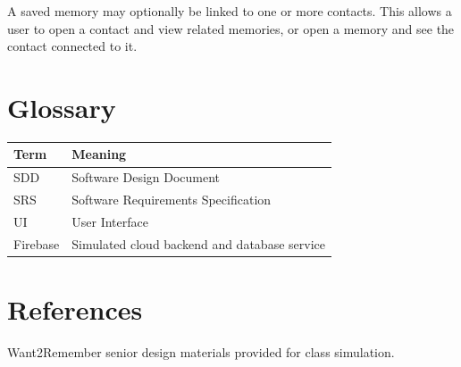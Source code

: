 \documentclass{article}
\begin{document}
A saved memory may optionally be linked to one or more contacts. This allows a user to open a contact and view related memories, or open a memory and see the contact connected to it.

\section{Glossary}
\begin{longtable}{|p{3cm}|p{10cm}|}
\hline
Term & Meaning \\ \hline
SDD & Software Design Document \\ \hline
SRS & Software Requirements Specification \\ \hline
UI & User Interface \\ \hline
Firebase & Simulated cloud backend and database service \\ \hline
\end{longtable}

\section{References}
Want2Remember senior design materials provided for class simulation.
\end{document}
